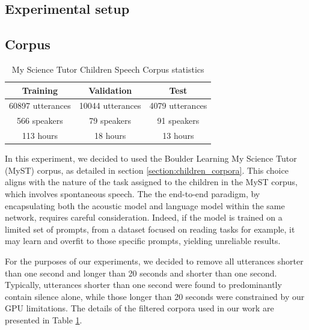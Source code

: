 \subsection{Experimental setup}
\label{section:methods_chapter4}

\subsection{Corpus}
\begin{table}[ht]
\centering
\begin{tabular}{c|c|c}
\hline
 Training & Validation     & Test   \\ \hline
60897 utterances  & 10044 utterances   & 4079 utterances \\ 
 566 speakers  & 79 speakers   & 91 speakers \\ 
 113 hours  & 18 hours   & 13 hours \\ \hline

\end{tabular}
\caption{My Science Tutor Children Speech Corpus statistics}
\label{tab:statistics_myst}
\end{table}
In this experiment, we decided to used  the Boulder Learning My Science Tutor (MyST) corpus, as detailed in section \ref{section:children_corpora}. This choice aligns with the nature of the task assigned to the children in the MyST corpus, which involves spontaneous speech. The the end-to-end paradigm, by encapsulating both the acoustic model and language model within the same network, requires careful consideration. Indeed, if the model is trained on a limited set of prompts, from a dataset focused on reading tasks for example, it may learn and overfit to those specific prompts, yielding unreliable results.

For the purposes of our experiments, we decided to remove all utterances shorter than one second and longer than 20 seconds and shorter than one second. Typically, utterances shorter than one second were found to predominantly contain silence alone, while those longer than 20 seconds were constrained by our GPU limitations. The details of the filtered corpora used in our work are presented in Table \ref{tab:statistics_myst}. 

